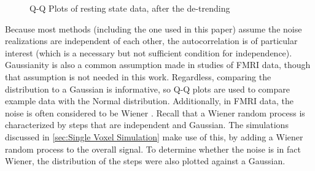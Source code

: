 \begin{figure}
\centering
{}
\caption{Q-Q Plots of resting state data, after the de-trending}
\label{fig:QQSpline}
\end{figure}

Because most methods (including the one used in this paper)
assume the noise realizations are independent of each other, the autocorrelation
is of particular interest (which is a necessary but not
sufficient condition for independence). Gaussianity is also a common
assumption made in studies of FMRI data, though that assumption is not
needed in this work. Regardless, comparing the distribution to a Gaussian
is informative, so Q-Q plots are used to compare example data with the
Normal distribution. Additionally, in FMRI data, the noise is often considered
to be Wiener \cite{Riera2003}. Recall that a Wiener random process is
characterized by steps that are independent and Gaussian. The simulations discussed in
\autoref{sec:Single Voxel Simulation} make use of this,
by adding a Wiener random process to the overall signal. To determine
whether the noise is in fact Wiener, the distribution of
the steps were also plotted against a Gaussian.

